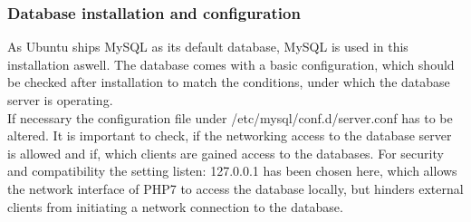 \subsubsection{Database installation and configuration}
As Ubuntu ships MySQL as its default database, MySQL is used in this installation aswell. The database comes with a basic configuration, which should be checked after installation
to match the conditions, under which the database server is operating.\\
If necessary the configuration file under /etc/mysql/conf.d/server.conf has to be altered. It is important to check, if the networking access to the database server is allowed and 
if, which clients are gained access to the databases. For security and compatibility the setting listen: 127.0.0.1 has been chosen here, which allows the network interface of PHP7
to access the database locally, but hinders external clients from initiating a network connection to the database.

